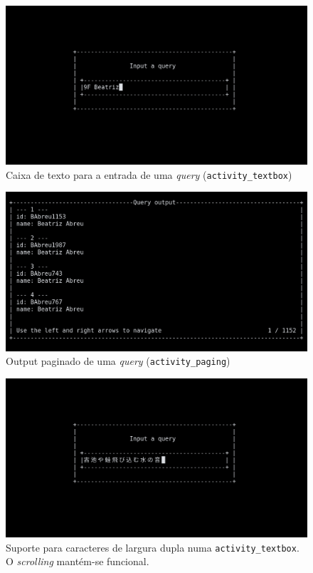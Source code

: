 \documentclass[12pt, a4paper]{article}
\begin{document}
\begin{figure}[ht]
    \centering
    \includegraphics[scale=0.25]{res-fase2/interactive_screenshots/textbox.png}
	\caption{Caixa de texto para a entrada de uma \emph{query} (\texttt{activity\_textbox})}
    \label{fig:textbox}
\end{figure}

\begin{figure}[ht]
    \centering
    \includegraphics[scale=0.25]{res-fase2/interactive_screenshots/paging.png}
	\caption{Output paginado de uma \emph{query} (\texttt{activity\_paging})}
    \label{fig:paging}
\end{figure}

\begin{figure}[ht]
    \centering
    \includegraphics[scale=0.25]{res-fase2/interactive_screenshots/japanese.png}
	\caption{Suporte para caracteres de largura dupla numa \texttt{activity\_textbox}.
	         O \emph{scrolling} mantém-se funcional.}
    \label{fig:japanese}
\end{figure}
\end{document}
